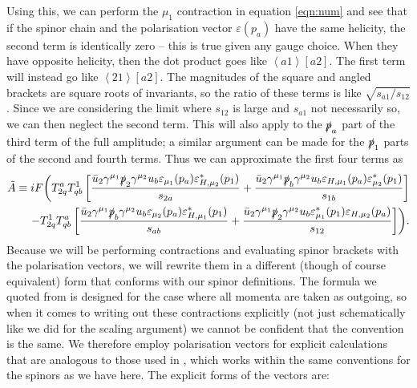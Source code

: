 Using this, we can perform the $\mu_1$ contraction in equation \ref{eqn:num} and see that if the spinor chain and the polarisation vector $\varepsilon(p_a)$ have the same helicity, the second term is identically zero -- this is true given any gauge choice. When they have opposite helicity, then the dot product goes like $\left<a 1 \right> [ a 2]$. The first term will instead go like $\left<2 1 \right>[a 2]$. The magnitudes of the square and angled brackets are square roots of invariants, so the ratio of these terms is like $\sqrt{s_{a1}/s_{12}}$. Since we are considering the limit where $s_{12}$ is large and $s_{a1}$ not necessarily so, we can then neglect the second term. This will also apply to the $\slashed{p}_a$ part of the third term of the full amplitude; a similar argument can be made for the $\slashed{p}_1$ parts of the second and fourth terms. Thus we can approximate the first four terms as %
\begin{equation}
\begin{split}
\tilde{A} \equiv i F \biggl( T^a_{2q}T^1_{qb} \left[ \frac{ \bar{u}_2 \gamma^{\mu_1} \slashed{p}_2 \gamma^{\mu_2} u_b \varepsilon_{\mu_1} (p_a) \varepsilon_{H,\mu_2}^*(p_1)}{s_{2a}} + \frac{\bar{u}_2 \gamma^{\mu_1} \slashed{p}_b\gamma^{\mu_2}u_b \varepsilon_{H,\mu_1}(p_a)\varepsilon^*_{\mu_2}(p_1)}{s_{1b}} \right] \\
- T^1_{2q}T^a_{qb} \left[ \frac{\bar{u}_2 \gamma^{\mu_1}\slashed{p}_b \gamma^{\mu_2} u_b \varepsilon_{\mu_2}(p_a)\varepsilon^*_{H,\mu_1}(p_1)}{s_{ab}} + \frac{\bar{u}_2 \gamma^{\mu_1}\slashed{p}_2\gamma^{\mu_2}u_b \varepsilon_{\mu_1}^*(p_1) \varepsilon_{H,\mu_2}(p_a)}{s_{12}} \right] \biggr).
\end{split}
\end{equation}
Because we will be performing contractions and evaluating spinor brackets with the polarisation vectors, we will rewrite them in a different (though of course equivalent) form that conforms with our spinor definitions. The formula we quoted from \cite{Dixon1996} is designed for the case where all momenta are taken as outgoing, so when it comes to writing out these contractions explicitly (not just schematically like we did for the scaling argument) we cannot be confident that the convention is the same. We therefore employ polarisation vectors for explicit calculations that are analogous to those used in \cite{Andersen2010}, which works within the same conventions for the spinors as we have here. The explicit forms of the vectors are: %
